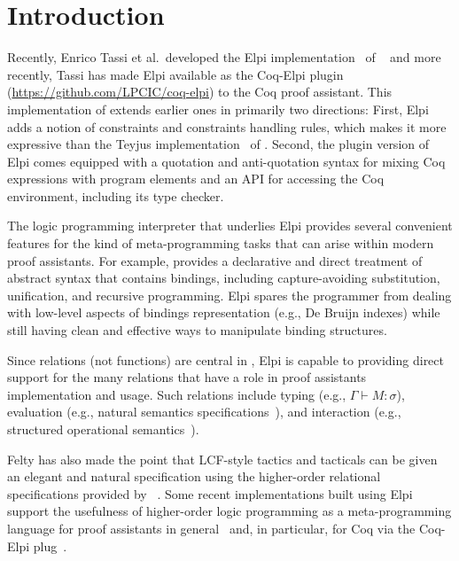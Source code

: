 \section{Introduction}
\label{sec:intro}

Recently, Enrico Tassi et al.\ developed the Elpi
implementation~\cite{dunchev15lpar} of \lP~\cite{miller12proghol} and
more recently, Tassi has made Elpi available as the Coq-Elpi
plugin~\cite{tassi18coqpl} (\url{https://github.com/LPCIC/coq-elpi})
to the Coq proof assistant.  This implementation of \lP extends
earlier ones in primarily two directions: First, Elpi adds a notion of
constraints and constraints handling rules, which makes it more
expressive than the Teyjus implementation~\cite{nadathur99cade} of
\lP. Second, the plugin version of Elpi comes equipped with a
quotation and anti-quotation syntax for mixing Coq expressions with
\lP program elements and an API for accessing the Coq environment,
including its type checker.

The logic programming interpreter that underlies Elpi provides several
convenient features for the kind of meta-programming tasks that can
arise within modern proof assistants.  For example, \lP provides a
declarative and direct treatment of abstract syntax that contains
bindings, including capture-avoiding substitution,
unification, and recursive programming.  Elpi spares the
programmer from dealing with low-level aspects of bindings
representation (e.g., De Bruijn indexes) while still having clean and
effective ways to manipulate binding structures.

Since relations (not functions) are central in \lP, Elpi is capable to
providing direct support for the many relations that have a role in
proof assistants implementation and usage.  Such relations include
typing (e.g., $\Gamma\vdash M\colon\sigma$), evaluation (e.g., natural
semantics specifications~\cite{kahn87stacs,hannan93jfp}), and
interaction (e.g., structured operational semantics~\cite{milner89book,plotkin81}).

Felty has also made the point that LCF-style tactics and tacticals can
be given an elegant and natural specification using the higher-order
relational specifications provided by \lP~\cite{felty93jar}.  Some
recent implementations built using Elpi support the usefulness of
higher-order logic programming as a meta-programming language for
proof assistants in general~\cite{DunchevCT16,coen19mscs} and, in
particular, for Coq via the Coq-Elpi plug~\cite{CohenST20,tassi19itp}.

